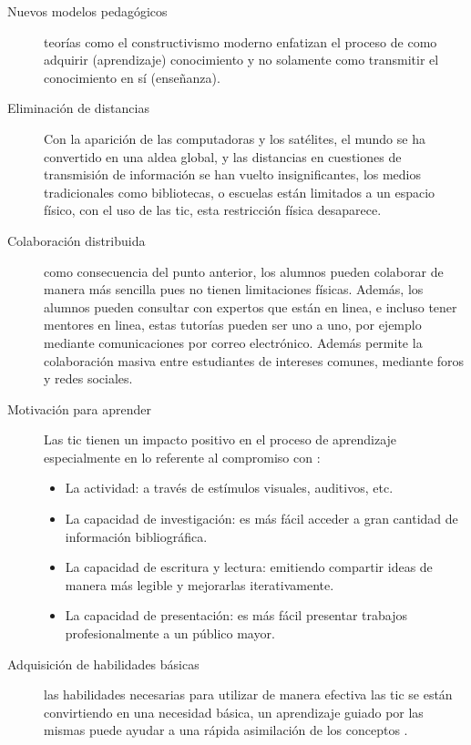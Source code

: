 \begin{description}

    \item[Nuevos modelos pedagógicos] teorías como el constructivismo moderno
        enfatizan el proceso de como adquirir (aprendizaje) conocimiento y no
        solamente como transmitir el conocimiento en sí (enseñanza).

    \item[Eliminación de distancias] Con la aparición de las computadoras y los satélites, 
        el mundo se ha convertido en una aldea global, y las distancias en cuestiones de
        transmisión de información se han vuelto insignificantes\cite{mohammed2013information}, 
        los medios tradicionales como bibliotecas, o escuelas están limitados a un espacio 
        físico, con el uso de las \Gls{tic}, esta restricción física
        desaparece\cite{tinio:ict}.

    \item[Colaboración distribuida] como consecuencia del punto anterior, los
        alumnos pueden colaborar de manera más sencilla pues no tienen
        limitaciones físicas. Además, los alumnos pueden consultar con expertos
        que están en linea, e incluso tener mentores en linea, estas tutorías
        pueden ser uno a uno, por ejemplo mediante comunicaciones por correo
        electrónico. Además permite la colaboración masiva entre estudiantes de
        intereses comunes, mediante foros y redes sociales\cite{unesco:ict}.

    \item[Motivación para aprender] Las \Gls{tic} tienen un impacto positivo en
	    el proceso de aprendizaje especialmente en lo referente al
	    compromiso con \cite{passey2004motivational,egenfeldt2007third}:
	    
	    \begin{itemize}
	    \item La actividad: a través de estímulos visuales,
	    auditivos, etc.
	    \item La capacidad de investigación: es más fácil acceder a
	    gran cantidad de información bibliográfica.
	    \item La capacidad de escritura y lectura: emitiendo compartir 
	    ideas de manera más legible y mejorarlas iterativamente.
	    \item La capacidad de presentación: es más fácil
	    presentar trabajos profesionalmente a un público
	    mayor.
	    \end{itemize}
	    
    \item[Adquisición de habilidades básicas] las habilidades necesarias para
	    utilizar de manera efectiva las \Gls{tic} se están convirtiendo en
	    una necesidad básica, un aprendizaje guiado por las mismas puede
	    ayudar a una rápida asimilación de los conceptos
        .

\end{description}

